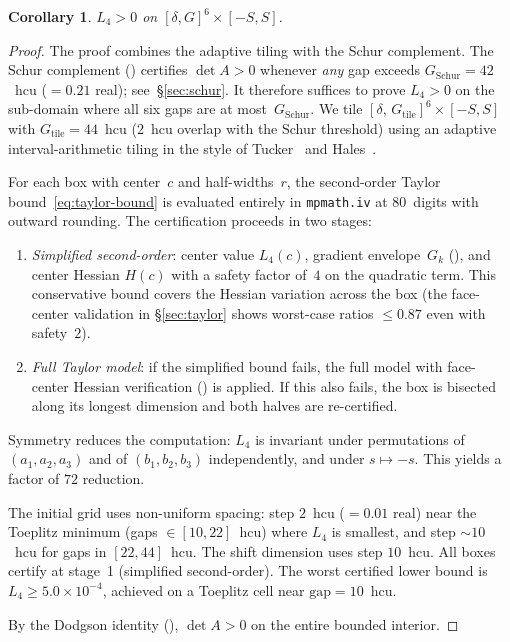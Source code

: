 \documentclass[11pt,a4paper]{amsart}
\newtheorem{corollary}[theorem]{Corollary}
\theoremstyle{definition}
\theoremstyle{remark}
\begin{document}
\begin{corollary}\label{cor:region1}
$L_4 > 0$ on $[\delta, G]^6 \times [-S, S]$.
\end{corollary}
\begin{proof}
The proof combines the adaptive tiling with the Schur
complement.  The Schur complement () certifies
$\det A > 0$ whenever \emph{any} gap exceeds $G_{\mathrm{Schur}} =
42$~hcu ($= 0.21$ real); see~\S\ref{sec:schur}.
It therefore suffices to prove $L_4 > 0$ on the sub-domain
where all six gaps are at most~$G_{\mathrm{Schur}}$.
We tile $[\delta,\,G_{\mathrm{tile}}]^6 \times [-S, S]$ with
$G_{\mathrm{tile}} = 44$~hcu ($2$~hcu overlap with the Schur threshold)
using an adaptive interval-arithmetic tiling in the style of
Tucker~\cite{Tucker2011} and Hales~\cite{Hales2005}.

For each box with center~$c$ and half-widths~$r$,
the second-order Taylor bound~\eqref{eq:taylor-bound} is
evaluated entirely in \texttt{mpmath.iv} at $80$~digits
with outward rounding.
The certification proceeds in two stages:
\begin{enumerate}[nosep]
  \item \emph{Simplified second-order}: center value
    $L_4(c)$, gradient envelope~$G_k$
    (), and center Hessian $H(c)$
    with a safety factor of~$4$ on the quadratic term.
    This conservative bound covers
    the Hessian variation across the box
    (the face-center validation in \S\ref{sec:taylor}
    shows worst-case ratios $\le 0.87$ even with safety~$2$).
  \item \emph{Full Taylor model}: if the simplified bound
    fails, the full model with face-center Hessian
    verification () is applied.
    If this also fails, the box is bisected along its
    longest dimension and both halves are re-certified.
\end{enumerate}
Symmetry reduces the computation: $L_4$ is invariant under
permutations of $(a_1, a_2, a_3)$ and of $(b_1, b_2, b_3)$
independently, and under $s \mapsto -s$.
This yields a factor of $72$ reduction.

The initial grid uses non-uniform spacing: step $2$~hcu
($= 0.01$ real) near the Toeplitz minimum
(gaps $\in [10, 22]$~hcu) where $L_4$ is smallest,
and step $\sim\!10$~hcu for gaps in $[22, 44]$~hcu.
The shift dimension uses step $10$~hcu.
All boxes certify at stage~1 (simplified second-order).
The worst certified lower bound is $L_4 \ge 5.0 \times 10^{-4}$,
achieved on a Toeplitz cell near $\text{gap} = 10$~hcu.

By the Dodgson identity (),
$\det A > 0$ on the entire bounded interior.
\end{proof}
\end{document}
